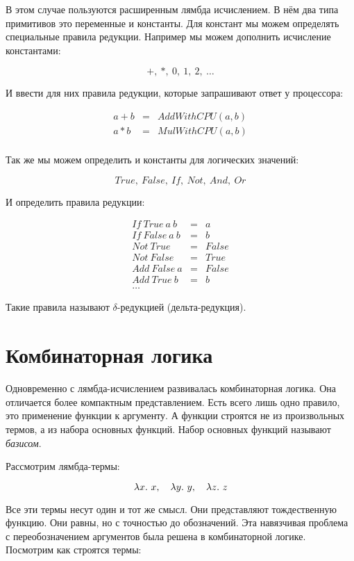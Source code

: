 В этом случае пользуются расширенным лямбда исчислением. В нём
два типа примитивов это переменные и константы. Для констант
мы можем определять специальные правила редукции. Например
мы можем дополнить исчисление константами:

\[ +,\ *,\ 0,\ 1,\ 2,\ \dots \]

И ввести для них правила редукции, которые запрашивают
ответ у процессора:

\begin{eqnarray*}
a+b &=& AddWithCPU(a, b) \\
a*b &=& MulWithCPU(a, b) \\
\end{eqnarray*}

Так же мы можем определить и константы для логических значений:

\[ True,\ False,\ If,\ Not,\ And,\ Or \]

И  определить правила редукции:

\begin{eqnarray*}
If\ True\ a\ b &=& a \\
If\ False\ a\ b &=& b \\
Not\ True &=& False \\
Not\ False &=& True \\
Add\ False\ a &=& False \\
Add\ True\ b &=& b \\
\dots
\end{eqnarray*}

Такие правила называют $\delta$-редукцией (дельта-редукция).

\section{Комбинаторная логика}

Одновременно с лямбда-исчислением развивалась комбинаторная
логика. Она отличается более компактным представлением. 
Есть всего лишь одно правило, это применение функции 
к аргументу. А функции строятся не из произвольных термов,
а из набора основных функций. Набор основных функций называют
\emph{базисом}.

Рассмотрим лямбда-термы:

\[ \lambda x .\  x, \quad \lambda y .\  y, \quad \lambda z .\  z  \]

Все эти термы несут один и тот же смысл. Они представляют
тождественную функцию. Они равны, но с точностью до обозначений.
Эта навязчивая проблема с переобозначением аргументов была решена
в комбинаторной логике. Посмотрим как строятся термы:

